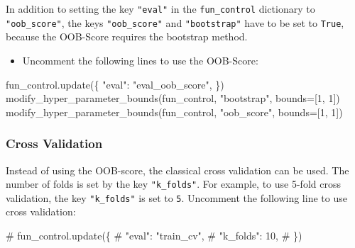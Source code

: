 \documentclass[
  letterpaper,
  DIV=11,
  numbers=noendperiod]{scrreprt}
\newenvironment{Shaded}{\begin{snugshade}}{\end{snugshade}}
\newcommand{\CommentTok}[1]{\textcolor[rgb]{0.37,0.37,0.37}{#1}}
\newcommand{\DecValTok}[1]{\textcolor[rgb]{0.68,0.00,0.00}{#1}}
\newcommand{\NormalTok}[1]{\textcolor[rgb]{0.00,0.23,0.31}{#1}}
\newcommand{\OperatorTok}[1]{\textcolor[rgb]{0.37,0.37,0.37}{#1}}
\newcommand{\StringTok}[1]{\textcolor[rgb]{0.13,0.47,0.30}{#1}}
\providecommand{\tightlist}{%
  \setlength{\itemsep}{0pt}\setlength{\parskip}{0pt}}\usepackage{longtable,booktabs,array}
\begin{document}
\begin{tcolorbox}[enhanced jigsaw, rightrule=.15mm, opacityback=0, colframe=quarto-callout-note-color-frame, opacitybacktitle=0.6, toptitle=1mm, arc=.35mm, colbacktitle=quarto-callout-note-color!10!white, coltitle=black, toprule=.15mm, leftrule=.75mm, titlerule=0mm, title=\textcolor{quarto-callout-note-color}{\faInfo}\hspace{0.5em}{OOB-Score}, bottomrule=.15mm, breakable, bottomtitle=1mm, left=2mm, colback=white]

In addition to setting the key \texttt{"eval"} in the
\texttt{fun\_control} dictionary to \texttt{"oob\_score"}, the keys
\texttt{"oob\_score"} and \texttt{"bootstrap"} have to be set to
\texttt{True}, because the OOB-Score requires the bootstrap method.

\end{tcolorbox}

\begin{itemize}
\tightlist
\item
  Uncomment the following lines to use the OOB-Score:
\end{itemize}

\begin{Shaded}
\begin{Highlighting}[]
\NormalTok{fun\_control.update(\{}
    \StringTok{"eval"}\NormalTok{: }\StringTok{"eval\_oob\_score"}\NormalTok{,}
\NormalTok{\})}
\NormalTok{modify\_hyper\_parameter\_bounds(fun\_control, }\StringTok{"bootstrap"}\NormalTok{, bounds}\OperatorTok{=}\NormalTok{[}\DecValTok{1}\NormalTok{, }\DecValTok{1}\NormalTok{])}
\NormalTok{modify\_hyper\_parameter\_bounds(fun\_control, }\StringTok{"oob\_score"}\NormalTok{, bounds}\OperatorTok{=}\NormalTok{[}\DecValTok{1}\NormalTok{, }\DecValTok{1}\NormalTok{])}
\end{Highlighting}
\end{Shaded}

\hypertarget{cross-validation}{%
\subsubsection{Cross Validation}\label{cross-validation}}

Instead of using the OOB-score, the classical cross validation can be
used. The number of folds is set by the key \texttt{"k\_folds"}. For
example, to use 5-fold cross validation, the key \texttt{"k\_folds"} is
set to \texttt{5}. Uncomment the following line to use cross validation:

\begin{Shaded}
\begin{Highlighting}[]
\CommentTok{\# fun\_control.update(\{}
\CommentTok{\#      "eval": "train\_cv",}
\CommentTok{\#      "k\_folds": 10,}
\CommentTok{\# \})}
\end{Highlighting}
\end{Shaded}
\end{document}
